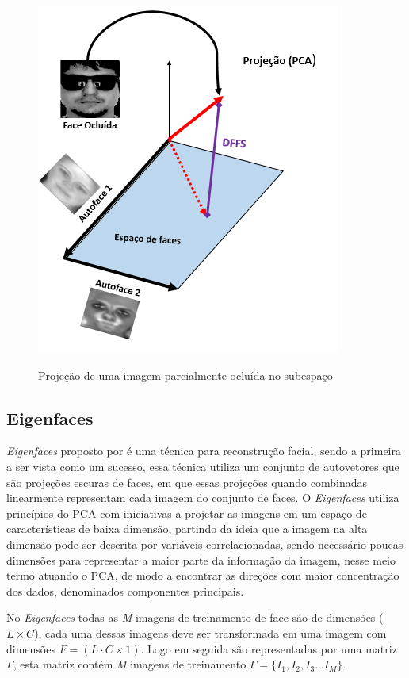 \begin{figure}[H]
\centering
\caption{Projeção de uma imagem parcialmente ocluída no subespaço}
\includegraphics[scale = 0.75]{imgs/pca2.png}
\label{fig:pca2}
\end{figure}



\subsection{Eigenfaces}

\textit{Eigenfaces} proposto por  é uma técnica para reconstrução facial, sendo a primeira a ser vista como um sucesso, essa técnica utiliza um conjunto de autovetores que são projeções escuras de faces, em que essas projeções quando combinadas linearmente representam cada imagem do conjunto de faces. O \textit{Eigenfaces} utiliza princípios do PCA com iniciativas a projetar as imagens em um espaço de características de baixa dimensão, partindo da ideia que a imagem na alta dimensão pode ser descrita por variáveis correlacionadas, sendo necessário poucas dimensões para representar a maior parte da informação da imagem, nesse meio termo atuando o PCA, de modo a encontrar as direções com maior concentração dos dados, denominados componentes principais.

No \textit{Eigenfaces} todas as \textit{M} imagens de treinamento de face são de dimensões ($L \times C$), cada uma dessas imagens deve ser transformada em uma imagem com dimensões $F = (L\cdot C \times 1)$. Logo em seguida são representadas por uma matriz $\Gamma$, esta matriz contém \textit{M} imagens de treinamento \textit{$ \Gamma = \{ I_1,I_2,I_3...I_M \}$}. 


